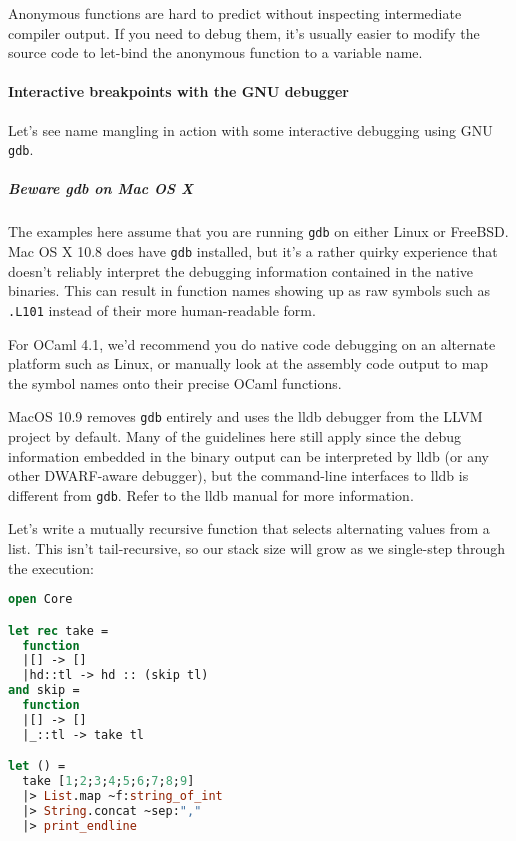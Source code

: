 Anonymous functions are hard to predict without inspecting intermediate
compiler output. If you need to debug them, it's usually easier to
modify the source code to let-bind the anonymous function to a variable
name.

\hypertarget{interactive-breakpoints-with-the-gnu-debugger}{%
\paragraph{Interactive breakpoints with the GNU
debugger}\label{interactive-breakpoints-with-the-gnu-debugger}}

Let's see name mangling in action with some interactive debugging using
GNU \passthrough{\lstinline!gdb!}. 

\hypertarget{beware-gdb-on-mac-os-x}{%
\subparagraph{Beware gdb on Mac OS X}\label{beware-gdb-on-mac-os-x}}

The examples here assume that you are running
\passthrough{\lstinline!gdb!} on either Linux or FreeBSD. Mac OS X 10.8
does have \passthrough{\lstinline!gdb!} installed, but it's a rather
quirky experience that doesn't reliably interpret the debugging
information contained in the native binaries. This can result in
function names showing up as raw symbols such as
\passthrough{\lstinline!.L101!} instead of their more human-readable
form.

For OCaml 4.1, we'd recommend you do native code debugging on an
alternate platform such as Linux, or manually look at the assembly code
output to map the symbol names onto their precise OCaml functions.

MacOS 10.9 removes \passthrough{\lstinline!gdb!} entirely and uses the
lldb debugger from the LLVM project by default. Many of the guidelines
here still apply since the debug information embedded in the binary
output can be interpreted by lldb (or any other DWARF-aware debugger),
but the command-line interfaces to lldb is different from
\passthrough{\lstinline!gdb!}. Refer to the lldb manual for more
information.

Let's write a mutually recursive function that selects alternating
values from a list. This isn't tail-recursive, so our stack size will
grow as we single-step through the execution:

\begin{lstlisting}[language=Caml]
open Core

let rec take =
  function
  |[] -> []
  |hd::tl -> hd :: (skip tl)
and skip =
  function
  |[] -> []
  |_::tl -> take tl

let () =
  take [1;2;3;4;5;6;7;8;9]
  |> List.map ~f:string_of_int
  |> String.concat ~sep:","
  |> print_endline
\end{lstlisting}

